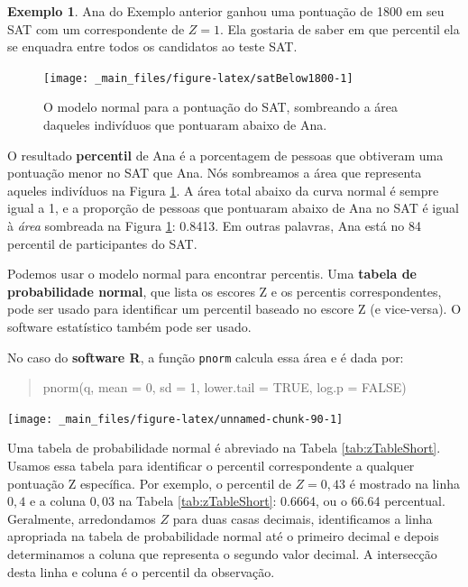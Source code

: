 \documentclass[
]{book}
\theoremstyle{definition}
\theoremstyle{definition}
\newtheorem{example}{Exemplo}[chapter]
\theoremstyle{definition}
\theoremstyle{definition}
\theoremstyle{remark}
\begin{document}
\begin{example}
\protect\hypertarget{exm:unnamed-chunk-88}{}{\label{exm:unnamed-chunk-88} }Ana do Exemplo anterior ganhou uma pontuação de 1800 em seu SAT com um correspondente de \(Z=1\). Ela gostaria de saber em que percentil ela se enquadra entre todos os candidatos ao teste SAT.
\end{example}

\begin{figure}
\texttt{[image: \_main\_files/figure-latex/satBelow1800-1]} \caption{O modelo normal para a pontuação do SAT, sombreando a área daqueles indivíduos que pontuaram abaixo de Ana.}\label{fig:satBelow1800}
\end{figure}

O resultado \textbf{percentil} de Ana é a porcentagem de pessoas que obtiveram uma pontuação menor no SAT que Ana. Nós sombreamos a área que representa aqueles indivíduos na Figura \ref{fig:satBelow1800}. A área total abaixo da curva normal é sempre igual a 1, e a proporção de pessoas que pontuaram abaixo de Ana no SAT é igual à \emph{área} sombreada na Figura \ref{fig:satBelow1800}: 0.8413. Em outras palavras, Ana está no 84 percentil de participantes do SAT.

Podemos usar o modelo normal para encontrar percentis. Uma \textbf{tabela de probabilidade normal}, que lista os escores Z e os percentis correspondentes, pode ser usado para identificar um percentil baseado no escore Z (e vice-versa). O software estatístico também pode ser usado.

No caso do \textbf{software R}, a função \texttt{pnorm} calcula essa área e é dada por:

\begin{quote}
pnorm(q, mean = 0, sd = 1, lower.tail = TRUE, log.p = FALSE)
\end{quote}

\texttt{[image: \_main\_files/figure-latex/unnamed-chunk-90-1]}

Uma tabela de probabilidade normal é abreviado na Tabela \ref{tab:zTableShort}. Usamos essa tabela para identificar o percentil correspondente a qualquer pontuação Z específica. Por exemplo, o percentil de \(Z=0,43\) é mostrado na linha \(0,4\) e a coluna \(0,03\) na Tabela \ref{tab:zTableShort}: 0.6664, ou o 66.64 percentual. Geralmente, arredondamos \(Z\) para duas casas decimais, identificamos a linha apropriada na tabela de probabilidade normal até o primeiro decimal e depois determinamos a coluna que representa o segundo valor decimal. A intersecção desta linha e coluna é o percentil da observação.
\end{document}

